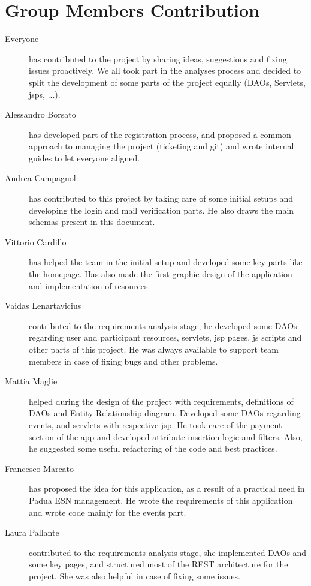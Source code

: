 \section{Group Members Contribution}

\begin{description}
    \item[Everyone] has contributed to the project by sharing ideas, suggestions and fixing issues proactively. We all took part in the analyses process and decided to split the development of some parts of the project equally (DAOs, Servlets, jsps, ...).
    \item[Alessandro Borsato] has developed part of the registration process, and proposed a common approach to managing the project (ticketing and git) and wrote internal guides to let everyone aligned.
    \item[Andrea Campagnol] has contributed to this project by taking care of some initial setups and developing the login and mail verification parts. He also draws the main schemas present in this document.
    \item[Vittorio Cardillo] has helped the team in the initial setup and developed some key parts like the homepage. Has also made the first graphic design of the application and implementation of resources.
    \item[Vaidas Lenartavicius] contributed to the requirements analysis stage, he developed some DAOs regarding user and participant resources, servlets, jsp pages, js scripts and other parts of this project. He was always available to support team members in case of fixing bugs and other problems.
    \item[Mattia Maglie] helped during the design of the project with requirements, definitions of DAOs and Entity-Relationship diagram. Developed some DAOs regarding events, and servlets with respective jsp. He took care of the payment section of the app and developed attribute insertion logic and filters. Also, he suggested some useful refactoring of the code and best practices.
    \item[Francesco Marcato] has proposed the idea for this application, as a result of a practical need in Padua ESN management. He wrote the requirements of this application and wrote code mainly for the events part.
    \item[Laura Pallante] contributed to the requirements analysis stage, she implemented DAOs and some key pages, and structured most of the REST architecture for the project. She was also helpful in case of fixing some issues.

\end{description}
